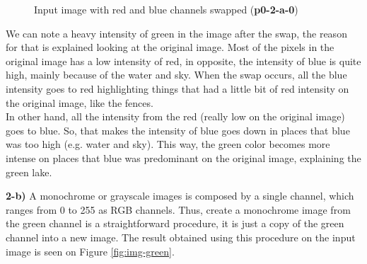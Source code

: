 \documentclass[12pt,a4paper]{article}
\begin{document}
\begin{figure}[!h]
	\centering
	{%
		\setlength{\fboxsep}{1pt}%
		\setlength{\fboxrule}{1pt}%
	}%
	\caption{Input image with red and blue channels swapped (\textbf{p0-2-a-0})}
	\label{fig:p0-2-a-0}
\end{figure}

We can note a heavy intensity of green in the image after the swap, the reason for that is explained looking at the original image. Most of the pixels in the original image has a low intensity of red, in opposite, the intensity of blue is quite high, mainly because of the water and sky. When the swap occurs, all the blue intensity goes to red highlighting things that had a little bit of red intensity on the original image, like the fences. \\

In other hand, all the intensity from the red (really low on the original image) goes to blue. So, that makes the intensity of blue goes down in places that blue was too high (e.g. water and sky). This way, the green color becomes more intense on places that blue was predominant on the original image, explaining the green lake. \\

\newpage

\textbf{2-b) } A monochrome or grayscale images is composed by a single channel, which ranges from 0 to 255 as RGB channels. Thus, create a monochrome image from the green channel is a straightforward procedure, it is just a copy of the green channel into a new image. The result obtained using this procedure on the input image is seen on Figure \ref{fig:img-green}.
\end{document}
